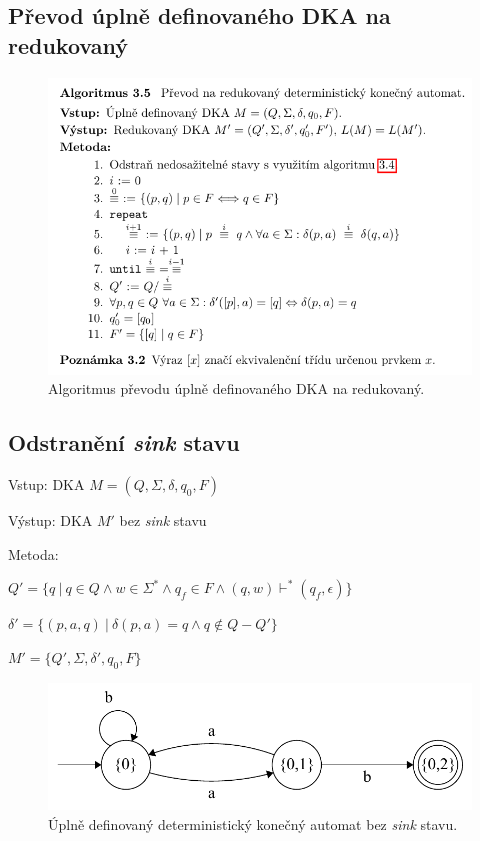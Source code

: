 \subsection{Převod úplně definovaného DKA na redukovaný}

\begin{figure}[H]
    \centering
    \includegraphics[width=0.9\linewidth]{prevod_na_redukovany_dka.pdf}
    \caption{Algoritmus převodu úplně definovaného DKA na redukovaný.}
\end{figure}

\subsection{Odstranění \textit{sink} stavu}

\begin{compactitem}
    \item Vstup: DKA $M = (Q, \Sigma, \delta, q_0, F)$
    \item Výstup: DKA $M'$ bez \textit{sink} stavu
    \item Metoda: \begin{compactenum}
        \item $Q' = \{ q ~|~ q \in Q \land w \in \Sigma^* \land q_f \in F \land (q, w) \vdash^* (q_f, \epsilon) \}$
        \item $\delta' = \{ (p, a, q) ~|~ \delta(p, a) = q \land q \not\in Q - Q' \}$
        \item $M' = \{ Q', \Sigma, \delta', q_0, F \}$
    \end{compactenum}
\end{compactitem}

\begin{figure}[H]
    \centering
    \includegraphics[width=0.75\linewidth]{dka.pdf}
    \caption{Úplně definovaný deterministický konečný automat bez \textit{sink} stavu.}
\end{figure}


